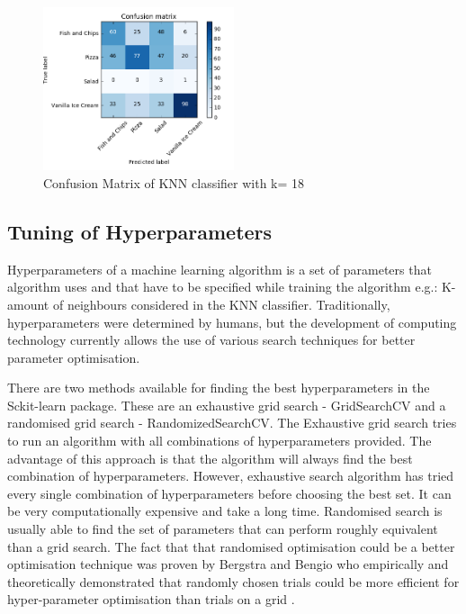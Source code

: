 \begin{figure}[h]
\centering
\includegraphics[width=0.5\textwidth]{Figures/conf_k-18.PNG}
\caption{Confusion Matrix of KNN classifier with k= 18}
\label{fig:k18}
\end{figure}




\subsection{Tuning of Hyperparameters}
Hyperparameters of a machine learning algorithm is a set of parameters that algorithm uses and that have to be specified while training the algorithm e.g.: K- amount of neighbours considered in the KNN classifier. Traditionally, hyperparameters were determined by humans, but the development of computing technology currently allows the use of various search techniques for better parameter optimisation.

There are two methods available for finding the best hyperparameters in the Sckit-learn package. These are an exhaustive grid search - GridSearchCV and a randomised grid search - RandomizedSearchCV.  The Exhaustive grid search tries to run an algorithm with all combinations of hyperparameters provided. The advantage of this approach is that the algorithm will always find the best combination of hyperparameters. However, exhaustive search algorithm has tried every single combination of hyperparameters before choosing the best set. It can be very computationally expensive and take a long time. Randomised search is usually able to find the set of parameters that can perform roughly equivalent than a grid search. The fact that that randomised optimisation could be a better optimisation technique was proven by Bergstra and Bengio who empirically and theoretically demonstrated that randomly chosen trials could be more efficient for hyper-parameter optimisation than trials on a grid \cite{bergstra2012random}.

